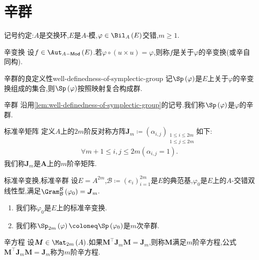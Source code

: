 \section{辛群}

记号约定:$A$是交换环,$E$是$A$-模,$\varphi\in\Bil_{A}\left(E\right)$交错,$m\geq 1$.

\begin{definition}{辛变换}{}
	设$f\in\Aut_{A-\mathsf{Mod}}\left(E\right)$.若$\varphi\circ\left(u\times u\right)=\varphi$,则称$f$是关于$\varphi$的辛变换(或辛自同构).
\end{definition}

\begin{lemma}{辛群的良定义性}{well-definedness-of-symplectic-group}
	记$\Sp\left(\varphi\right)$是$E$上关于$\varphi$的辛变换组成的集合,则$\Sp\left(\varphi\right)$按照映射复合构成群.
\end{lemma}

\begin{definition}{辛群}{}
	沿用\cref{lem:well-definedness-of-symplectic-group}的记号.我们称$\Sp\left(\varphi\right)$是$\varphi$的辛群.
\end{definition}

\begin{definition}{标准辛矩阵}{}
	定义$A$上的$2m$阶反对称方阵$\boldsymbol{J}_{m}\coloneq\left(\alpha_{i,j}\right)_{\substack{1\leq i\leq 2m\\ 1\leq j\leq 2m}}$如下:
	\begin{align*}
		\forall m+1\leq i,j\leq 2m\left(\alpha_{i,j}=1\right).
	\end{align*}
	我们称$\boldsymbol{J}_{m}$是$\boldsymbol{A}$上的$m$阶辛矩阵.
\end{definition}

\begin{definition}{标准辛变换,标准辛群}{}
	设$E=A^{2m}$,$\mathcal{B}\coloneq\left(e_{i}\right)_{i=1}^{2m}$是$E$的典范基,$\varphi_{0}$是$E$上的$A$-交错双线性型,满足$\Gram_{\mathcal{B}}^{\mathcal{B}}\left(\varphi_{0}\right)=\boldsymbol{J}_{m}$.
	\begin{enumerate}
		\item 我们称$\varphi_{0}$是$E$上的标准辛变换.
		\item 我们称$\Sp_{2m}\left(\varphi\right)\coloneq\Sp\left(\varphi_{0}\right)$是$m$次辛群.
	\end{enumerate}
\end{definition}

\begin{definition}{辛方程}{}
	设$\boldsymbol{M}\in\Mat_{2m}\left(A\right)$.如果$\boldsymbol{M}^{\top}\boldsymbol{J}_{m}\boldsymbol{M}=\boldsymbol{J}_{m}$,则称$\boldsymbol{M}$满足$m$阶辛方程,公式$\boldsymbol{M}^{\top}\boldsymbol{J}_{m}\boldsymbol{M}=\boldsymbol{J}_{m}$称为$m$阶辛方程.
\end{definition}

